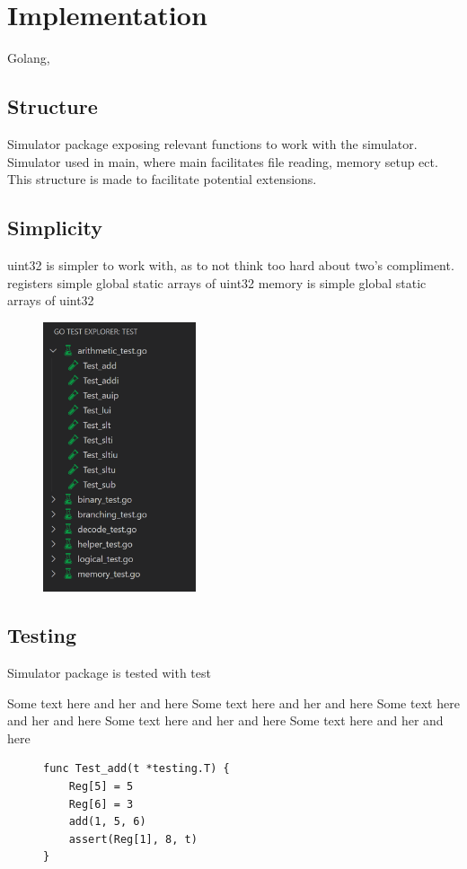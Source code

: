 \section*{Implementation}

Golang, 

\subsection*{Structure}
Simulator package exposing relevant functions to work with the simulator.
Simulator used in main, where main facilitates file reading, memory setup ect.
This structure is made to facilitate potential extensions.

\subsection*{Simplicity}

uint32 is simpler to work with, as to not think too hard about two's compliment.
registers simple global static arrays of uint32
memory is simple global static arrays of uint32

\begin{figure}
    \centering
    \includegraphics[width=0.4\textwidth]{images/test.png}
\end{figure}

\subsection*{Testing}
Simulator package is tested with test


Some text here and her and here
Some text here and her and here
Some text here and her and here
Some text here and her and here
Some text here and her and here



\begin{figure}[h]
\begin{verbatim}
func Test_add(t *testing.T) {
    Reg[5] = 5
    Reg[6] = 3
    add(1, 5, 6)
    assert(Reg[1], 8, t)
}
\end{verbatim}
\end{figure}

\begin{figure}
    \centering
\end{figure}
\newpage
